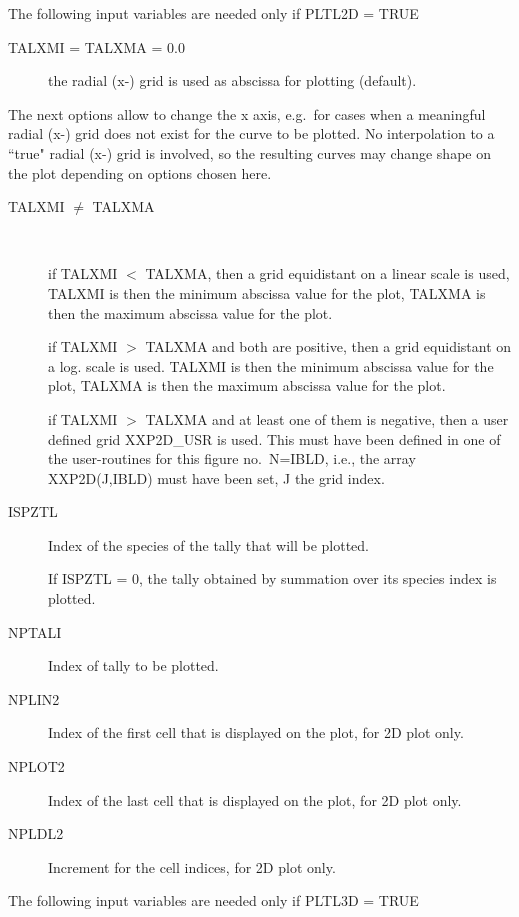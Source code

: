 The following input variables are needed only if PLTL2D = TRUE

\begin{description}
  \item[TALXMI = TALXMA = 0.0] the radial (x-) grid is used
        as abscissa for plotting (default).
\end{description}
The next options allow to change the x axis, e.g.\ for cases when a meaningful
radial (x-) grid does not exist for the curve to be plotted.
No interpolation to a ``true" radial (x-) grid is involved, so the resulting
curves may change shape on the plot depending on options chosen here.
\begin{description}
  \item[TALXMI $\neq$ TALXMA] ~ 

        if TALXMI $<$ TALXMA, then a grid equidistant on a linear scale is used, TALXMI
        is then the minimum abscissa value for the plot, TALXMA is then the maximum
        abscissa value for the plot.

        if TALXMI $>$ TALXMA and both are positive, then a grid equidistant on
        a
        log. scale is used.
        TALXMI is then the minimum abscissa value for the plot, TALXMA is then the
        maximum abscissa value for the plot.

        if TALXMI $>$ TALXMA and at least one of them is negative,
        then a user defined grid XXP2D\_USR is used.
        This must have been defined in one of the user-routines for this figure no.\
        N=IBLD, i.e., the array XXP2D(J,IBLD) must have been set, J the grid index.
  \item[ISPZTL] Index of the species of the tally that will be plotted.

        If ISPZTL = 0, the tally obtained by summation over its species index is
        plotted.
  \item[NPTALI] Index of tally to be plotted.
  \item[NPLIN2] Index of the first cell that is displayed on the plot, for 2D
        plot only.
  \item[NPLOT2] Index of the last cell that is displayed on the plot, for 2D plot
        only.
  \item[NPLDL2] Increment for the cell indices, for 2D plot only.
\end{description}

The following input variables are needed only if PLTL3D = TRUE


